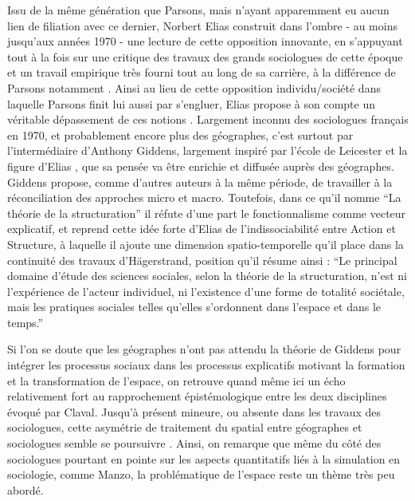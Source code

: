 Issu de la même génération que Parsons, mais n'ayant apparemment eu aucun lien de filiation avec ce dernier, Norbert Elias construit dans l'ombre - au moins jusqu'aux années 1970 - une lecture de cette opposition innovante, en s'appuyant tout à la fois sur une critique des travaux des grands sociologues de cette époque et un travail empirique très fourni tout au long de sa carrière, à la différence de Parsons notamment \autocite{Mennell1989}. Ainsi au lieu de cette opposition individu/société dans laquelle Parsons finit lui aussi par s'engluer, Elias propose à son compte un véritable dépassement de ces notions \autocite[94-101]{Heinich2002}. Largement inconnu des sociologues français en 1970, et probablement encore plus des géographes, c'est surtout par l'intermédiaire d'Anthony Giddens, largement inspiré par l'école de Leicester et la figure d'Elias \autocite[172-178]{Dunning2013}, que sa pensée va être enrichie et diffusée auprès des géographes. Giddens propose, comme d'autres auteurs à la même période, de travailler à la réconciliation des approches micro et macro. Toutefois, dans ce qu'il nomme \enquote{La théorie de la structuration} il réfute d'une part le fonctionnalisme comme vecteur explicatif, et reprend cette idée forte d'Elias de l'indissociabilité entre Action et Structure, à laquelle il ajoute une dimension spatio-temporelle qu'il place dans la continuité des travaux d'Hägerstrand, position qu'il résume ainsi : \enquote{Le principal domaine d’étude des sciences sociales, selon la théorie de la structuration, n’est ni l’expérience de l’acteur individuel, ni l’existence d’une forme de totalité sociétale, mais les pratiques sociales telles qu’elles s’ordonnent dans l’espace et dans le temps.} \autocite[2]{Giddens1984, Giddens1987}


Si l'on se doute que les géographes n'ont pas attendu la théorie de Giddens pour intégrer les processus sociaux dans les processus explicatifs motivant la formation et la transformation de l'espace, on retrouve quand même ici un écho relativement fort au rapprochement épistémologique entre les deux disciplines évoqué par Claval. Jusqu'à présent mineure, ou absente dans les travaux des sociologues, cette asymétrie de traitement du spatial entre géographes et sociologues semble se poursuivre \autocite{Rhein2003}. Ainsi, on remarque que même du côté des sociologues pourtant en pointe sur les aspects quantitatifs liés à la simulation en sociologie, comme Manzo, la problématique de l'espace reste un thème très peu abordé.

